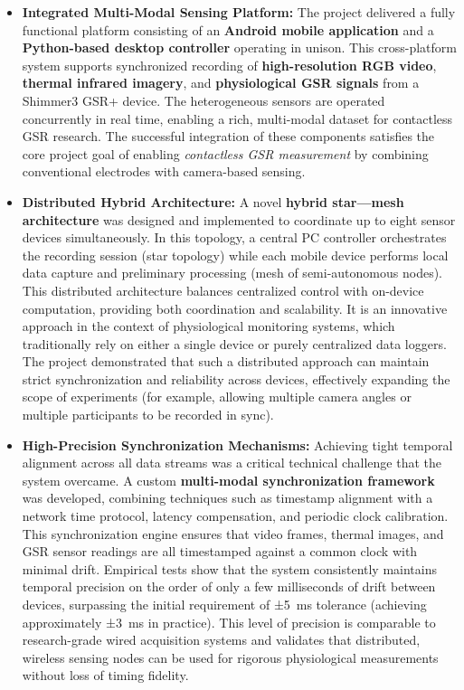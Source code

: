 \documentclass[11pt,a4paper]{report}
\begin{document}
\begin{itemize}
\item \textbf{Integrated Multi-Modal Sensing Platform:} The project delivered a
  fully functional platform consisting of an \textbf{Android mobile
  application} and a \textbf{Python-based desktop controller} operating in
  unison. This cross-platform system supports synchronized recording of
  \textbf{high-resolution RGB video}, \textbf{thermal infrared imagery}, and
  \textbf{physiological GSR signals} from a Shimmer3 GSR+ device. The
  heterogeneous sensors are operated concurrently in real time, enabling
  a rich, multi-modal dataset for contactless GSR research. The
  successful integration of these components satisfies the core project
  goal of enabling \textit{contactless GSR measurement} by combining
  conventional electrodes with camera-based sensing.

\item \textbf{Distributed Hybrid Architecture:} A novel \textbf{hybrid star---mesh
  architecture} was designed and implemented to coordinate up to eight
  sensor devices simultaneously. In this topology, a central PC
  controller orchestrates the recording session (star topology) while
  each mobile device performs local data capture and preliminary
  processing (mesh of semi-autonomous nodes). This distributed
  architecture balances centralized control with on-device computation,
  providing both coordination and scalability. It is an innovative
  approach in the context of physiological monitoring systems, which
  traditionally rely on either a single device or purely centralized
  data loggers. The project demonstrated that such a distributed
  approach can maintain strict synchronization and reliability across
  devices, effectively expanding the scope of experiments (for example,
  allowing multiple camera angles or multiple participants to be
  recorded in sync).

\item \textbf{High-Precision Synchronization Mechanisms:} Achieving tight
  temporal alignment across all data streams was a critical technical
  challenge that the system overcame. A custom \textbf{multi-modal
  synchronization framework} was developed, combining techniques such
  as timestamp alignment with a network time protocol, latency
  compensation, and periodic clock calibration. This synchronization
  engine ensures that video frames, thermal images, and GSR sensor
  readings are all timestamped against a common clock with minimal
  drift. Empirical tests show that the system consistently maintains
  temporal precision on the order of only a few milliseconds of drift
  between devices, surpassing the initial requirement of ±5 ms tolerance
  (achieving approximately ±3 ms in
  practice\cite{Boucsein2012}).
  This level of precision is comparable to research-grade wired
  acquisition systems and validates that distributed, wireless sensing
  nodes can be used for rigorous physiological measurements without loss
  of timing fidelity.


\end{itemize}
\end{document}
